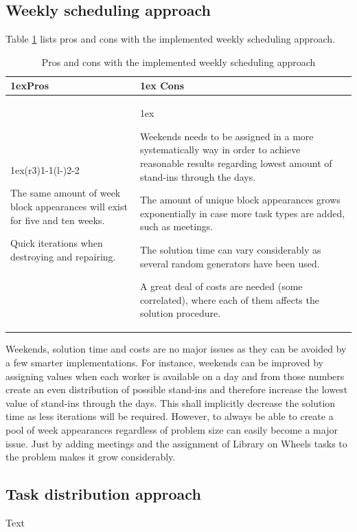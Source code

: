 \subsection{Weekly scheduling approach}
Table \ref{pros_cons_weekly_scheduling} lists pros and cons with the implemented weekly scheduling approach.
\begin{table}[!h]
\caption{Pros and cons with the implemented weekly scheduling approach}
\label{pros_cons_weekly_scheduling}
\begin{tabularx}{\linewidth}{>{\parskip1ex}X@{\kern4\tabcolsep}>{\parskip1ex}X}
\toprule
\hfil\bfseries Pros
&
\hfil\bfseries Cons
\\\cmidrule(r{3\tabcolsep}){1-1}\cmidrule(l{-\tabcolsep}){2-2}

The same amount of week block appearances will exist for five and ten weeks.\par
Quick iterations when destroying and repairing.\par

&

Weekends needs to be assigned in a more systematically way in order to achieve reasonable results regarding lowest amount of stand-ins through the days.\par
The amount of unique block appearances grows exponentially in case more task types are added, such as meetings.\par
The solution time can vary considerably as several random generators have been used.\par
A great deal of costs are needed (some correlated), where each of them affects the solution procedure.

\\\bottomrule
\end{tabularx}
\end{table}

 Weekends, solution time and costs are no major issues as they can be avoided by a few smarter implementations. For instance, weekends can be improved by assigning values when each worker is available on a day and from those numbers create an even distribution of possible stand-ins and therefore increase the lowest value of stand-ins through the days. This shall implicitly decrease the solution time as less iterations will be required. However, to always be able to create a pool of week appearances regardless of problem size can easily become a major issue. Just by adding meetings and the assignment of Library on Wheels tasks to the problem makes it grow considerably.
 

\subsection{Task distribution approach}
Text